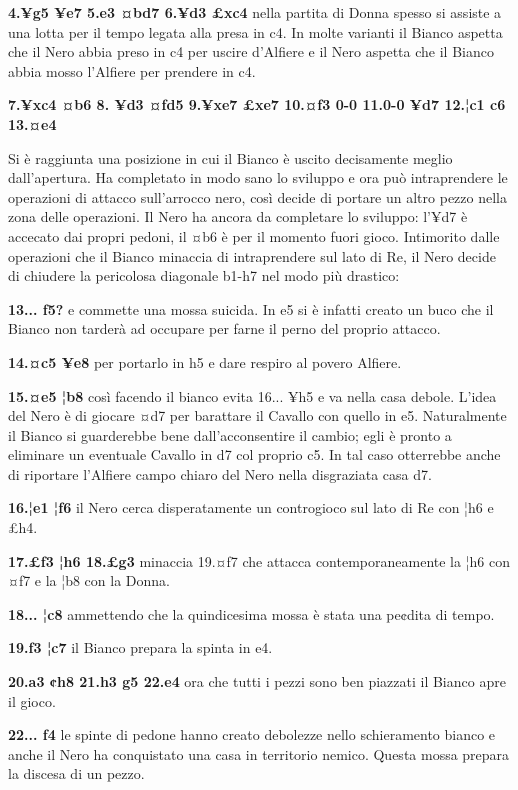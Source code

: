 \textbf{4.¥g5 ¥e7 5.e3 ¤bd7 6.¥d3 £xc4} nella partita di Donna spesso si
assiste a una lotta per il tempo legata alla presa in c4. In molte
varianti il Bianco aspetta che il Nero abbia preso in c4 per uscire
d'Alfiere e il Nero aspetta che il Bianco abbia mosso l'Alfiere per
prendere in c4.

\textbf{7.¥xc4 ¤b6 8. ¥d3 ¤fd5 9.¥xe7 £xe7 10.¤f3 0-0 11.0-0 ¥d7 12.¦c1
c6 13.¤e4}


Si è raggiunta una posizione in cui il Bianco è uscito decisamente
meglio dall'apertura. Ha completato in modo sano lo sviluppo e ora può
intraprendere le operazioni di attacco sull'arrocco nero, così decide di
portare un altro pezzo nella zona delle operazioni. Il Nero ha ancora da
completare lo sviluppo: l'¥d7 è accecato dai propri pedoni, il ¤b6 è per
il momento fuori gioco. Intimorito dalle operazioni che il Bianco
minaccia di intraprendere sul lato di Re, il Nero decide di chiudere la
pericolosa diagonale b1-h7 nel modo più drastico:

\textbf{13... f5?} e commette una mossa suicida. In e5 si è infatti
creato un buco che il Bianco non tarderà ad occupare per farne il perno
del proprio attacco.

\textbf{14.¤c5 ¥e8} per portarlo in h5 e dare respiro al povero Alfiere.

\textbf{15.¤e5 ¦b8} così facendo il bianco evita 16... ¥h5 e va nella
casa debole. L'idea del Nero è di giocare ¤d7 per barattare il Cavallo
con quello in e5. Naturalmente il Bianco si guarderebbe bene
dall'acconsentire il cambio; egli è pronto a eliminare un eventuale
Cavallo in d7 col proprio c5. In tal caso otterrebbe anche di riportare
l'Alfiere campo chiaro del Nero nella disgraziata casa d7.

\textbf{16.¦e1 ¦f6} il Nero cerca disperatamente un controgioco sul lato
di Re con ¦h6 e £h4.

\textbf{17.£f3 ¦h6 18.£g3} minaccia 19.¤f7 che attacca
contemporaneamente la ¦h6 con ¤f7 e la ¦b8 con la Donna.

\textbf{18... ¦c8} ammettendo che la quindicesima mossa è stata una
pe¢dita di tempo.

\textbf{19.f3 ¦c7} il Bianco prepara la spinta in e4.

\textbf{20.a3 ¢h8 21.h3 g5 22.e4} ora che tutti i pezzi sono ben
piazzati il Bianco apre il gioco.

\textbf{22... f4} le spinte di pedone hanno creato debolezze nello
schieramento bianco e anche il Nero ha conquistato una casa in
territorio nemico. Questa mossa prepara la discesa di un pezzo.

